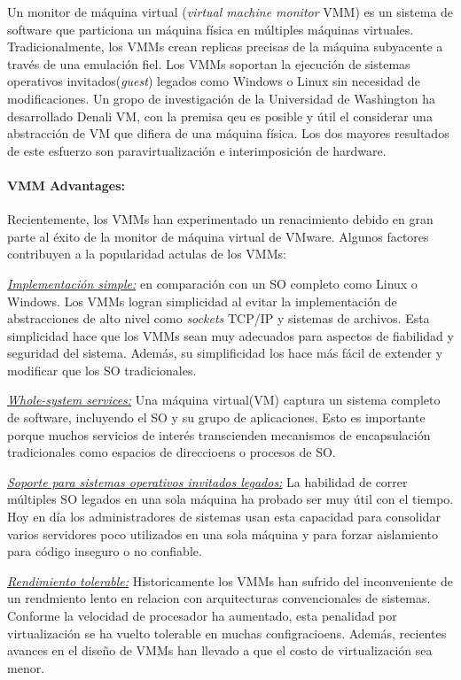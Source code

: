 Un monitor de máquina virtual (\emph{virtual machine monitor} VMM) es un sistema de software que particiona un máquina física en múltiples máquinas virtuales. Tradicionalmente, los VMMs crean replicas precisas de la máquina subyacente a través de una emulación fiel. Los VMMs soportan la ejecución de sistemas operativos invitados(\emph{guest}) legados como Windows o Linux sin necesidad de modificaciones. Un gropo de investigación de la Universidad de Washington ha desarrollado Denali VM, con la premisa qeu es posible y útil el considerar una abstracción de VM que difiera de una máquina física. Los dos mayores resultados de este esfuerzo son paravirtualización e interimposición de hardware. 

\paragraph{\textnormal{\textbf{VMM Advantages:}}}
Recientemente, los VMMs han experimentado un renacimiento debido en gran parte al éxito de la monitor de máquina virtual de VMware. Algunos factores contribuyen a la popularidad actulas de los VMMs: 

\underline{\emph{Implementación simple:}} en comparación con un SO completo como Linux o Windows. Los VMMs logran simplicidad al evitar la implementación de abstracciones de alto nivel como \emph{sockets} TCP/IP y sistemas de archivos. Esta simplicidad hace que los VMMs sean muy adecuados para aspectos de fiabilidad y seguridad del sistema. Además, su simplificidad los hace más fácil de extender y modificar que los SO tradicionales. 

\underline{\emph{Whole-system services:}} Una máquina virtual(VM) captura un sistema completo de software, incluyendo el SO y su grupo de aplicaciones. Esto es importante porque muchos servicios de interés transcienden mecanismos de encapsulación tradicionales como espacios de direccioens o procesos de SO. 

\underline{\emph{Soporte para sistemas operativos invitados legados:}} La habilidad de correr múltiples SO legados en una sola máquina ha probado ser muy útil con el tiempo. Hoy en día los administradores de sistemas usan esta capacidad para consolidar varios servidores poco utilizados en una sola máquina y para forzar aislamiento para código inseguro o no confiable. 

\underline{\emph{Rendimiento tolerable:}} Historicamente los VMMs han sufrido del inconveniente de un rendmiento lento en relacion con arquitecturas convencionales de sistemas. Conforme la velocidad de procesador ha aumentado, esta penalidad por virtualización se ha vuelto tolerable en muchas configracioens. Además, recientes avances en el diseño de VMMs han llevado a que el costo de virtualización sea menor. 

